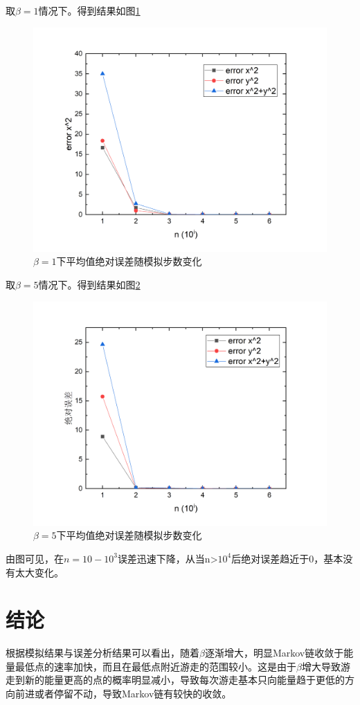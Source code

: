 \documentclass{article}
\begin{document}
		取$ \beta=1 $情况下。得到结果如图\ref{fig:5}
	\begin{figure}[!h]
		
		\centering
		\includegraphics[scale=0.5]{error1}
		\caption{\heiti{}$ \beta=1 $下平均值绝对误差随模拟步数变化}
		\label{fig:5}
	\end{figure}
	取$ \beta=5 $情况下。得到结果如图\ref{fig:6}
	\begin{figure}[!h]
		
		\centering
		\includegraphics[scale=0.5]{error}
		\caption{\heiti{}$ \beta=5 $下平均值绝对误差随模拟步数变化}
		\label{fig:6}
	\end{figure}
由图可见，在$ n=10-10^3 $误差迅速下降，从当n>$ 10^4 $后绝对误差趋近于0，基本没有太大变化。
	\section{结论}
	根据模拟结果与误差分析结果可以看出，随着$ \beta $逐渐增大，明显Markov链收敛于能量最低点的速率加快，而且在最低点附近游走的范围较小。这是由于$ \beta $增大导致游走到新的能量更高的点的概率明显减小，导致每次游走基本只向能量趋于更低的方向前进或者停留不动，导致Markov链有较快的收敛。
\end{document}
